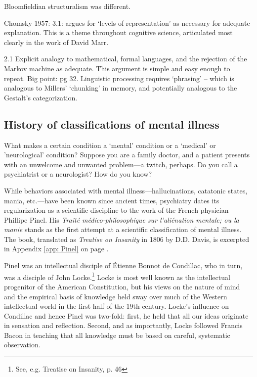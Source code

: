 Bloomfieldian structuralism was different.

Chomsky 1957:
3.1: argues for `levels of representation' as necessary for adequate explanation. This is a theme throughout cognitive science, articulated most clearly in the work of David Marr.

2.1 Explicit analogy to mathematical, formal languages, and the rejection of the Markov machine as adequate. This argument is simple and easy enough to repeat.
 Big point: pg 32. Linguistic processing requires `phrasing' – which is analogous to Millers' `chunking' in memory, and potentially analogous to the Gestalt's categorization.

\subsection{History of classifications of mental illness}
\label{historyofclassificationsofmentalillness}

What makes a certain condition a ‘mental’ condition or a `medical' or ’neurological’ condition? Suppose you are a family doctor, and a patient presents with an unwelcome and unwanted problem---a twitch, perhaps. Do you call a psychiatrist or a neurologist? How do you know?

While behaviors associated with mental illness---hallucinations, catatonic states, mania, etc.---have been known since ancient times, psychiatry dates its regularization as a scientific discipline to the work of the French physician Phillipe Pinel. His \emph{Traité médico-philosophique sur l'aliénation mentale; ou la manie} stands as the first attempt at a scientific classification of mental illness. The book, translated as \emph{Treatise on Insanity} in 1806 by D.D. Davis, is excerpted in Appendix \ref{app: Pinel} on page \pageref{app: Pinel}. 

Pinel was an intellectual disciple of Étienne Bonnot de Condillac, who in turn, was a disciple of John Locke.\footnote{See, e.g. Treatise on Insanity, p. 46} Locke is most well known as the intellectual progenitor of the American Constitution, but his views on the nature of mind and the empirical basis of knowledge held sway over much of the Western intellectual world in the first half of the 19th century. Locke's influence on Condillac and hence Pinel was two-fold: first, he held that all our ideas originate in sensation and reflection. Second, and as importantly, Locke followed Francis Bacon in teaching that all knowledge must be based on careful, systematic observation.

